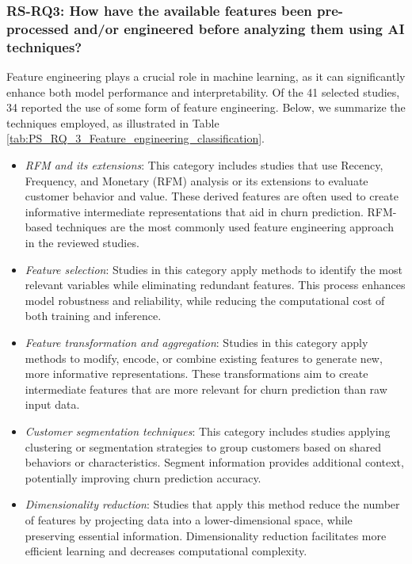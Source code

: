 \documentclass[preprint,12pt]{elsarticle}
\newcommand{\RSRQthree}{RS-RQ3: How have the available features been pre-processed and/or engineered before analyzing them using AI techniques?}
\begin{document}
\subsubsection{\RSRQthree}

Feature engineering plays a crucial role in machine learning, as it can significantly enhance both model performance and interpretability. Of the 41 selected studies, 34 reported the use of some form of feature engineering. Below, we summarize the techniques employed, as illustrated in Table \ref{tab:PS_RQ_3_Feature_engineering_classification}.



\begin{itemize}
    \item \textit{RFM and its extensions}: This category includes studies that use Recency, Frequency, and Monetary (RFM) analysis or its extensions to evaluate customer behavior and value. These derived features are often used to create informative intermediate representations that aid in churn prediction. RFM-based techniques are the most commonly used feature engineering approach in the reviewed studies.
    
    \item \textit{Feature selection}: Studies in this category apply methods to identify the most relevant variables while eliminating redundant features.
    This process enhances model robustness and reliability, while  reducing the computational cost of both training and inference. 
    
    \item \textit{Feature transformation and aggregation}: Studies in this category apply methods to modify, encode, or combine existing features to generate new, more informative representations. These transformations aim to create intermediate features that are more relevant for churn prediction than raw input data.

    \item \textit{Customer segmentation techniques}: This category includes studies applying clustering or segmentation strategies to group customers based on shared behaviors or characteristics. Segment information provides additional context, potentially improving churn prediction accuracy.

    \item \textit{Dimensionality reduction}: Studies that apply this method reduce the number of features by projecting data into a lower-dimensional space, while preserving essential information. Dimensionality reduction facilitates more efficient learning and decreases computational complexity.
\end{itemize}
\end{document}
